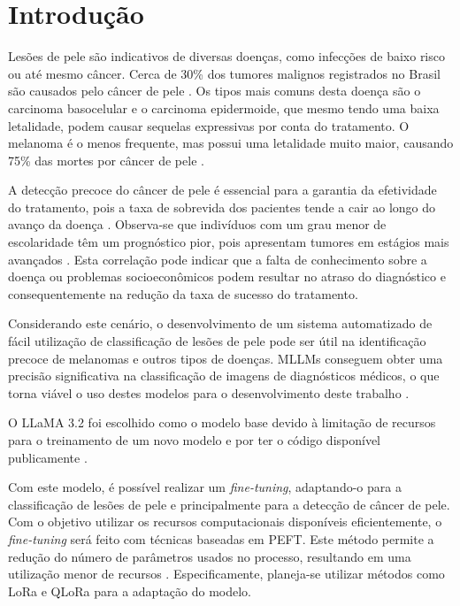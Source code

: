 \chapter{Introdução}

Lesões de pele são indicativos de diversas doenças, como infecções de baixo risco ou até mesmo câncer. Cerca de 30\% dos tumores malignos registrados no Brasil são
causados pelo câncer de pele \cite{skin_cancer_in_brazil}. Os tipos mais comuns desta doença são o carcinoma basocelular e o carcinoma epidermoide, que mesmo tendo uma
baixa letalidade, podem causar sequelas expressivas por conta do tratamento. O melanoma é o menos frequente, mas possui uma letalidade muito maior, causando 75\% das
mortes por câncer de pele \cite{skin_cancer_screening}.

A detecção precoce do câncer de pele é essencial para a garantia da efetividade do tratamento, pois a taxa de sobrevida dos pacientes tende a cair ao longo do avanço
da doença \cite{skin_cancer_survival}. Observa-se que indivíduos com um grau menor de escolaridade têm um prognóstico pior, pois apresentam tumores em estágios mais
avançados \cite{skin_cancer_socioeconomic}. Esta correlação pode indicar que a falta de conhecimento sobre a doença ou problemas socioeconômicos podem resultar no atraso
do diagnóstico e consequentemente na redução da taxa de sucesso do tratamento.

Considerando este cenário, o desenvolvimento de um sistema automatizado de fácil utilização de classificação de lesões de pele pode ser útil na identificação precoce de
melanomas e outros tipos de doenças. \acp{MLLM} conseguem obter uma precisão significativa na classificação de imagens de diagnósticos médicos, o que torna viável
o uso destes modelos para o desenvolvimento deste trabalho \cite{mllm_success_rate}.

O \ac{LLaMA} 3.2 foi escolhido como o modelo base devido à limitação de recursos para o treinamento de um novo modelo e por ter o código disponível publicamente
\cite{llama}.

Com este modelo, é possível realizar um \textit{fine-tuning}, adaptando-o para a classificação de lesões de pele e principalmente para a detecção de câncer de pele. Com
o objetivo utilizar os recursos computacionais disponíveis eficientemente, o \textit{fine-tuning} será feito com técnicas baseadas em \ac{PEFT}. Este método permite a
redução do número de parâmetros usados no processo, resultando em uma utilização menor de recursos \cite{peft}. Especificamente, planeja-se utilizar métodos como
\ac{LoRa} e \ac{QLoRa} para a adaptação do modelo.

